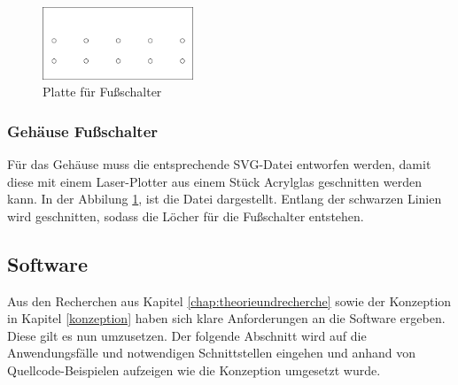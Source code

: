 \begin{figure}
	\centering
	\vspace{-32pt}
	\includegraphics[width=0.4\textwidth]{bilder/svg-schalter}
	\caption{Platte für Fußschalter}
	\label{durchfuehrung:svg-gehause}
\end{figure}
\subsubsection{Gehäuse Fußschalter}
Für das Gehäuse muss die entsprechende SVG-Datei entworfen werden, damit diese mit einem Laser-Plotter aus einem Stück Acrylglas geschnitten werden kann. In der Abbilung \ref{durchfuehrung:svg-gehause}, ist die Datei dargestellt. Entlang der schwarzen Linien wird geschnitten, sodass die Löcher für die Fußschalter entstehen.
\subsection{Software}
Aus den Recherchen aus Kapitel \ref{chap:theorieundrecherche} sowie der Konzeption in Kapitel \ref{konzeption} haben sich klare Anforderungen an die Software ergeben. Diese gilt es nun umzusetzen. Der folgende Abschnitt wird auf die Anwendungsfälle und notwendigen Schnittstellen eingehen und anhand von Quellcode-Beispielen aufzeigen wie die Konzeption umgesetzt wurde. 
